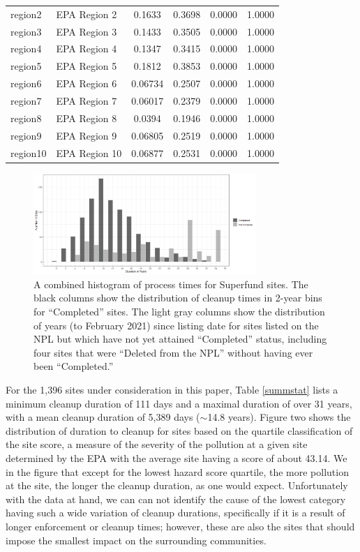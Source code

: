 \documentclass[12pt]{article}
\begin{document}
\begin{table}[t]
\begin{tabular}{l|l|cccc}
        region2 & EPA Region 2 & 0.1633 & 0.3698 & 0.0000 & 1.0000 \\ 
        region3 & EPA Region 3 & 0.1433 & 0.3505 & 0.0000 & 1.0000 \\ 
        region4 & EPA Region 4 & 0.1347 & 0.3415 & 0.0000 & 1.0000 \\ 
        region5 & EPA Region 5 & 0.1812 & 0.3853 & 0.0000 & 1.0000 \\ 
        region6 & EPA Region 6 & 0.06734 & 0.2507 & 0.0000 & 1.0000 \\ 
        region7 & EPA Region 7 & 0.06017 & 0.2379 & 0.0000 & 1.0000 \\ 
        region8 & EPA Region 8 & 0.0394 & 0.1946 & 0.0000 & 1.0000 \\ 
        region9 & EPA Region 9 & 0.06805 & 0.2519 & 0.0000 & 1.0000 \\ 
        region10 & EPA Region 10 & 0.06877 & 0.2531 & 0.0000 & 1.0000 \\
			\hline
	\end{tabular}
\end{table}


\begin{figure}[t] \centering
\includegraphics[width=0.75\textwidth]{fig2.png}
\caption{A combined histogram of process times for Superfund sites. The black columns show the distribution of cleanup times in 2-year bins for ``Completed'' sites. The light gray columns show the distribution of years (to February 2021) since listing date for sites listed on the NPL but which have not yet attained ``Completed'' status, including four sites that were ``Deleted from the NPL'' without having ever been ``Completed.''
\label{hist1}}
\end{figure}

For the 1,396 sites under consideration in this paper, Table \ref{summstat} lists a minimum cleanup duration of 111 days and a maximal duration of over 31 years, with a mean cleanup duration of 5,389 days ($\sim$14.8 years). Figure two shows the distribution of duration to cleanup for sites based on the quartile classification of the site score, a measure of the severity of the pollution at a given site determined by the EPA with the average site having a score of about 43.14. We in the figure that except for the lowest hazard score quartile, the more pollution at the site, the longer the cleanup duration, as one would expect. Unfortunately with the data at hand, we can can not identify the cause of the lowest category having such a wide variation of cleanup durations, specifically if it is a result of longer enforcement or cleanup times; however, these are also the sites that should impose the smallest impact on the surrounding communities.  
\end{document}
